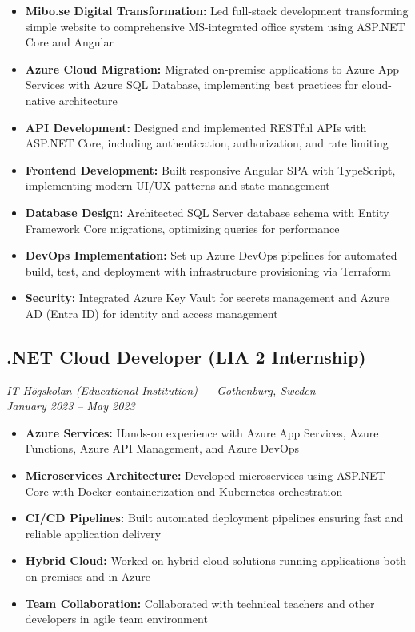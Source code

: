 \documentclass[10pt,a4paper]{article}
\begin{document}
\begin{itemize}[noitemsep,leftmargin=*]
\item \textbf{Mibo.se Digital Transformation:} Led full-stack development transforming simple website to comprehensive MS-integrated office system using ASP.NET Core and Angular
\item \textbf{Azure Cloud Migration:} Migrated on-premise applications to Azure App Services with Azure SQL Database, implementing best practices for cloud-native architecture
\item \textbf{API Development:} Designed and implemented RESTful APIs with ASP.NET Core, including authentication, authorization, and rate limiting
\item \textbf{Frontend Development:} Built responsive Angular SPA with TypeScript, implementing modern UI/UX patterns and state management
\item \textbf{Database Design:} Architected SQL Server database schema with Entity Framework Core migrations, optimizing queries for performance
\item \textbf{DevOps Implementation:} Set up Azure DevOps pipelines for automated build, test, and deployment with infrastructure provisioning via Terraform
\item \textbf{Security:} Integrated Azure Key Vault for secrets management and Azure AD (Entra ID) for identity and access management
\end{itemize}

\subsection*{.NET Cloud Developer (LIA 2 Internship)}
\textit{IT-Högskolan (Educational Institution) — Gothenburg, Sweden}\\
\textit{January 2023 -- May 2023}

\begin{itemize}[noitemsep,leftmargin=*]
\item \textbf{Azure Services:} Hands-on experience with Azure App Services, Azure Functions, Azure API Management, and Azure DevOps
\item \textbf{Microservices Architecture:} Developed microservices using ASP.NET Core with Docker containerization and Kubernetes orchestration
\item \textbf{CI/CD Pipelines:} Built automated deployment pipelines ensuring fast and reliable application delivery
\item \textbf{Hybrid Cloud:} Worked on hybrid cloud solutions running applications both on-premises and in Azure
\item \textbf{Team Collaboration:} Collaborated with technical teachers and other developers in agile team environment
\end{itemize}
\end{document}
